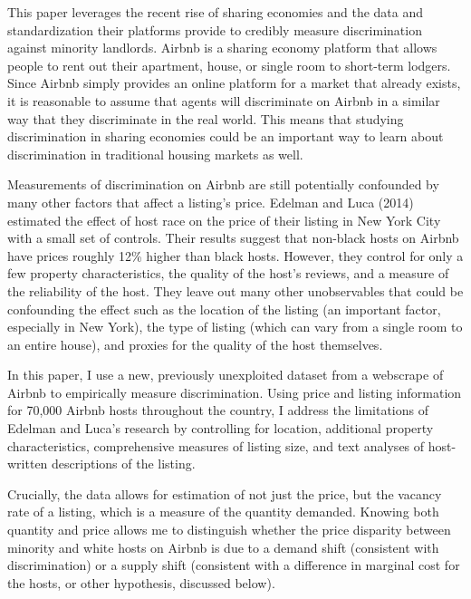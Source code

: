 This paper leverages the recent rise of sharing economies and the data and standardization their platforms provide to credibly measure discrimination against minority landlords. Airbnb is a sharing economy platform that allows people to rent out their apartment, house, or single room to short-term lodgers. Since Airbnb simply provides an online platform for a market that already exists, it is reasonable to assume that agents will discriminate on Airbnb in a similar way that they discriminate in the real world. This means that studying discrimination in sharing economies could be an important way to learn about discrimination in traditional housing markets as well.

Measurements of discrimination on Airbnb are still potentially confounded by many other factors that affect a listing's price. Edelman and Luca (2014) estimated the effect of host race on the price of their listing in New York City with a small set of controls. Their results suggest that non-black hosts on Airbnb have prices roughly 12\% higher than black hosts. However, they control for only a few property characteristics, the quality of the host's reviews, and a measure of the reliability of the host. They leave out many other unobservables that could be confounding the effect such as the location of the listing (an important factor, especially in New York), the type of listing (which can vary from a single room to an entire house), and proxies for the quality of the host themselves. %

In this paper, I use a new, previously unexploited dataset from a webscrape of Airbnb to empirically measure discrimination. Using price and listing information for 70,000 Airbnb hosts throughout the country, I address the limitations of Edelman and Luca's research by controlling for location, additional property characteristics, comprehensive measures of listing size, and text analyses of host-written descriptions of the listing. 

Crucially, the data allows for estimation of not just the price, but the vacancy rate of a listing, which is a measure of the quantity demanded. Knowing both quantity and price allows me to distinguish whether the price disparity between minority and white hosts on Airbnb is due to a demand shift (consistent with discrimination) or a supply shift (consistent with a difference in marginal cost for the hosts, or other hypothesis, discussed below). 

